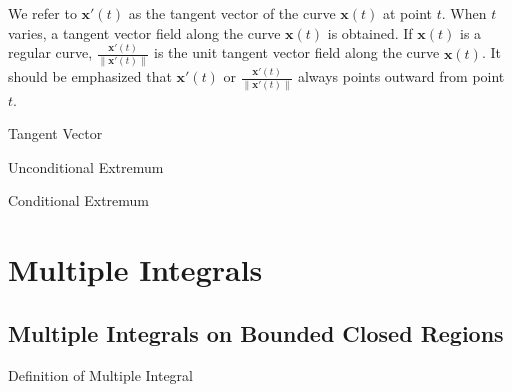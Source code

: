 \documentclass[11pt]{../../TexTemplate/elegantbook}
\begin{document}
We refer to \( \mathbf{x}'(t) \) as the tangent vector of the curve \( \mathbf{x}(t) \) at point \( t \). 
When \( t \) varies, a tangent vector field along the curve \( \mathbf{x}(t) \) is obtained. 
If \( \mathbf{x}(t) \) is a regular curve, 
\( \frac{\mathbf{x}'(t)}{\|\mathbf{x}'(t)\|} \) is the unit tangent vector field along the curve \( \mathbf{x}(t) \). 
It should be emphasized that \( \mathbf{x}'(t) \) or \( \frac{\mathbf{x}'(t)}{\|\mathbf{x}'(t)\|} \) 
always points outward from point \( t \).

\begin{definition}{Tangent Vector}
\end{definition}

\begin{leftbarTitle}{Unconditional Extremum}\end{leftbarTitle}

\begin{leftbarTitle}{Conditional Extremum}\end{leftbarTitle}


\chapter{Multiple Integrals}
\section{Multiple Integrals on Bounded Closed Regions}
\begin{leftbarTitle}{Definition of Multiple Integral}\end{leftbarTitle}
\end{document}
